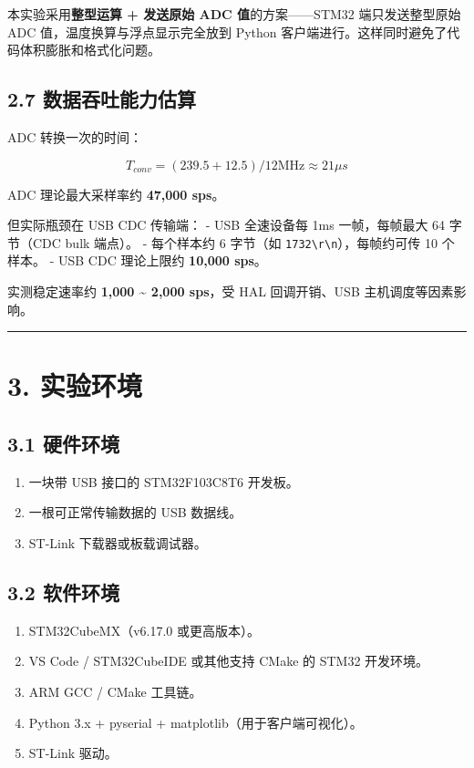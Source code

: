 \documentclass[
  chinese,
  UTF8,
  oneside,
  openany]{ctexbook}
\providecommand{\tightlist}{%
  \setlength{\itemsep}{0pt}\setlength{\parskip}{0pt}}
\begin{document}
本实验采用\textbf{整型运算 + 发送原始 ADC 值}的方案------STM32
端只发送整型原始 ADC 值，温度换算与浮点显示完全放到 Python
客户端进行。这样同时避免了代码体积膨胀和格式化问题。

\subsection{2.7
数据吞吐能力估算}\label{ux6570ux636eux541eux5410ux80fdux529bux4f30ux7b97}

ADC 转换一次的时间：

\[T_{conv} = (239.5 + 12.5) / 12\text{MHz} \approx 21 \mu s\]

ADC 理论最大采样率约 \textbf{47,000 sps}。

但实际瓶颈在 USB CDC 传输端： - USB 全速设备每 1ms 一帧，每帧最大 64
字节（CDC bulk 端点）。 - 每个样本约 6 字节（如
\texttt{1732\textbackslash{}r\textbackslash{}n}），每帧约可传 10
个样本。 - USB CDC 理论上限约 \textbf{10,000 sps}。

实测稳定速率约 \textbf{1,000 \textasciitilde{} 2,000 sps}，受 HAL
回调开销、USB 主机调度等因素影响。

\begin{center}\rule{0.5\linewidth}{0.5pt}\end{center}

\section{3. 实验环境}\label{ux5b9eux9a8cux73afux5883-2}

\subsection{3.1 硬件环境}\label{ux786cux4ef6ux73afux5883-2}

\begin{enumerate}
\def\labelenumi{\arabic{enumi}.}
\tightlist
\item
  一块带 USB 接口的 STM32F103C8T6 开发板。
\item
  一根可正常传输数据的 USB 数据线。
\item
  ST-Link 下载器或板载调试器。
\end{enumerate}

\subsection{3.2 软件环境}\label{ux8f6fux4ef6ux73afux5883-2}

\begin{enumerate}
\def\labelenumi{\arabic{enumi}.}
\tightlist
\item
  STM32CubeMX（v6.17.0 或更高版本）。
\item
  VS Code / STM32CubeIDE 或其他支持 CMake 的 STM32 开发环境。
\item
  ARM GCC / CMake 工具链。
\item
  Python 3.x + pyserial + matplotlib（用于客户端可视化）。
\item
  ST-Link 驱动。
\end{enumerate}
\end{document}
